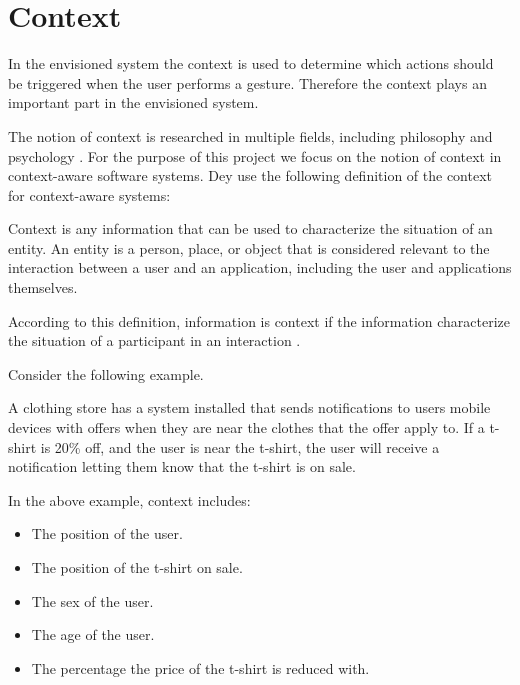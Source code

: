 \section{Context}
\label{sec:analysis:context}

In the envisioned system the context is used to determine which actions should be triggered when the user performs a gesture. Therefore the context plays an important part in the envisioned system.

The notion of context is researched in multiple fields, including philosophy and psychology \cite{bolchini2007data}. For the purpose of this project we focus on the notion of context in context-aware software systems. Dey \cite{abowd1999towards} use the following definition of the context for context-aware systems:

\begin{italicquote}
Context is any information that can be used to characterize the situation of an entity. An entity is a person, place, or object that is considered relevant to the interaction between a user and an application, including the user and applications themselves.
\end{italicquote}

According to this definition, information is context if the information characterize the situation of a participant in an interaction \cite{abowd1999towards}.

Consider the following example.

\begin{testexample}
A clothing store has a system installed that sends notifications to users mobile devices with offers when they are near the clothes that the offer apply to. If a t-shirt is 20\% off, and the user is near the t-shirt, the user will receive a notification letting them know that the t-shirt is on sale.
\end{testexample}

In the above example, context includes:

\begin{itemize}
\item The position of the user.
\item The position of the t-shirt on sale.
\item The sex of the user.
\item The age of the user.
\item The percentage the price of the t-shirt is reduced with.
\end{itemize}

